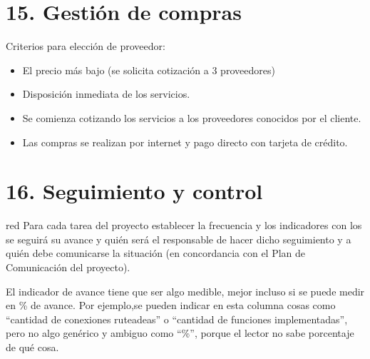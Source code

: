 \documentclass[11pt]{charter}
\begin{document}
\section{15. Gestión de compras}
\label{sec:compras}

Criterios para elección de proveedor:
\begin{itemize}
  \item El precio más bajo (se solicita cotización a 3 proveedores)
  \item Disposición inmediata de los servicios.
  \item Se comienza cotizando los servicios a los proveedores conocidos por el cliente.
  \item Las compras se realizan por internet y pago directo con tarjeta de crédito.
\end{itemize}

\section{16. Seguimiento y control}
\label{sec:seguimiento}

\begin{consigna}{red}
Para cada tarea del proyecto establecer la frecuencia y los indicadores con los se seguirá su avance y quién será el responsable de hacer dicho seguimiento y a quién debe comunicarse la situación (en concordancia con el Plan de Comunicación del proyecto).

El indicador de avance tiene que ser algo medible, mejor incluso si se puede medir en \% de avance. Por ejemplo,se pueden indicar en esta columna cosas como ``cantidad de conexiones ruteadeas'' o ``cantidad de funciones implementadas'', pero no algo genérico y ambiguo como ``\%'', porque el lector no sabe porcentaje de qué cosa.

\end{consigna}
\end{document}
